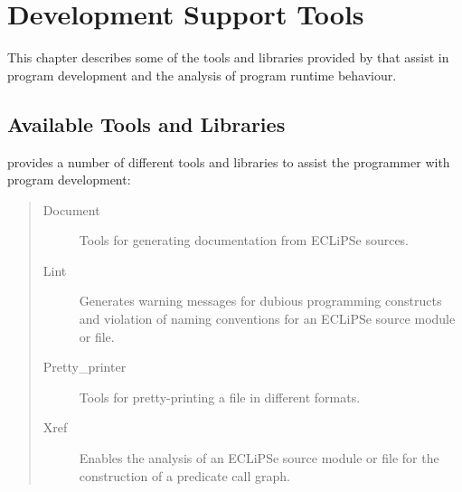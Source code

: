 %
%
%
%
%
\chapter{Development Support Tools\label{chapdevelsupport}}

This chapter describes some of the tools and libraries provided by
\eclipse{} that assist in program development and the analysis of
program runtime behaviour.
\section{Available Tools and Libraries}

\eclipse{} provides a number of different tools and libraries to assist
the programmer with program development:

\begin{quote}
\begin{description}
  \item[Document]
    Tools for generating documentation from ECLiPSe sources.
  \item[Lint]
    Generates warning messages for dubious programming
    constructs and violation of naming conventions for an ECLiPSe source
    module or file.
  \item[Pretty_printer]
    Tools for pretty-printing a file in different formats.
  \item[Xref]
    Enables the analysis of an ECLiPSe source module or
    file for the construction of a predicate call graph.
\end{description}
\end{quote}

